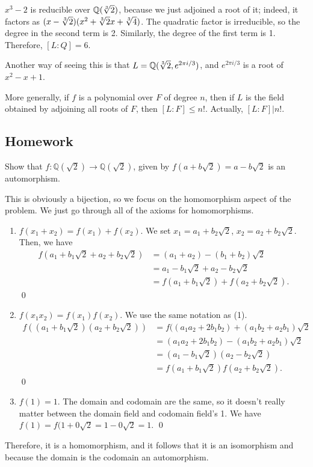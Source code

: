 \documentclass{scrartcl}
\begin{document}
$x^3-2$ is reducible over $\mathbb{Q} (\sqrt[3]{2})$, because we just adjoined a root of it; indeed, it factors as $(x-\sqrt[3]{2})(x^2 + \sqrt[3]{2}x + \sqrt[3]{4})$. The quadratic factor is irreducible, so the degree in the second term is 2. Similarly, the degree of the first term is 1. Therefore, $[L:Q] = 6$.

Another way of seeing this is that $L = \mathbb{Q} ( \sqrt[3]{2}, e^{2\pi i / 3})$, and $e^{2\pi i/3}$ is a root of $x^2-x+1$.

More generally, if $f$ is a polynomial over $F$ of degree $n$, then if $L$ is the field obtained by adjoining all roots of $F$, then $[L:F] \le n!$. Actually, $[L:F] | n!$.

\subsection{Homework}
\begin{problem}[4]
	Show that $f : \mathbb{Q}(\sqrt{2}) \to \mathbb{Q}(\sqrt{2})$, given by $f(a+b\sqrt{2}) = a-b\sqrt{2}$ is an automorphism.
\end{problem}

\begin{solution}
	This is obviously a bijection, so we focus on the homomorphism aspect of the problem. We just go through all of the axioms for homomorphisms. 

	\begin{enumerate}
		\item $f(x_1+x_2) = f(x_1) + f(x_2)$.
			We set $x_1 = a_1+b_2\sqrt{2}$, $x_2 = a_2+b_2\sqrt{2}$. Then, we have 
			\begin{align*}
				f(a_1+b_1\sqrt{2} + a_2+b_2\sqrt{2}) &= (a_1+a_2) - (b_1+b_2)\sqrt{2} \\
				&= a_1 - b_1\sqrt{2} + a_2 - b_2\sqrt{2} \\
				&= f(a_1+b_1\sqrt{2}) + f(a_2+b_2\sqrt{2}).
			\end{align*}
			\qed
		\item $f(x_1x_2) = f(x_1)f(x_2)$.
			We use the same notation as (1). %
			\begin{align*}
				f((a_1+b_1\sqrt{2})(a_2+b_2\sqrt{2})) &= f((a_1a_2 + 2b_1b_2) + (a_1b_2+a_2b_1)\sqrt{2} \\
				&= (a_1a_2 + 2b_1b_2) - (a_1b_2 + a_2b_1)\sqrt{2} \\
				&= (a_1-b_1\sqrt{2})(a_2-b_2\sqrt{2}) \\
				&= f(a_1+b_1\sqrt{2})f(a_2+b_2\sqrt{2}).
			\end{align*}
			\qed
		\item $f(1) = 1$. The domain and codomain are the same, so it doesn't really matter between the domain field and codomain field's 1. We have $f(1) = f(1+0\sqrt{2} = 1-0\sqrt{2} = 1$. \qed
	\end{enumerate}

	Therefore, it is a homomorphism, and it follows that it is an isomorphism and because the domain is the codomain an automorphism. \blackqed
\end{solution}
\end{document}

